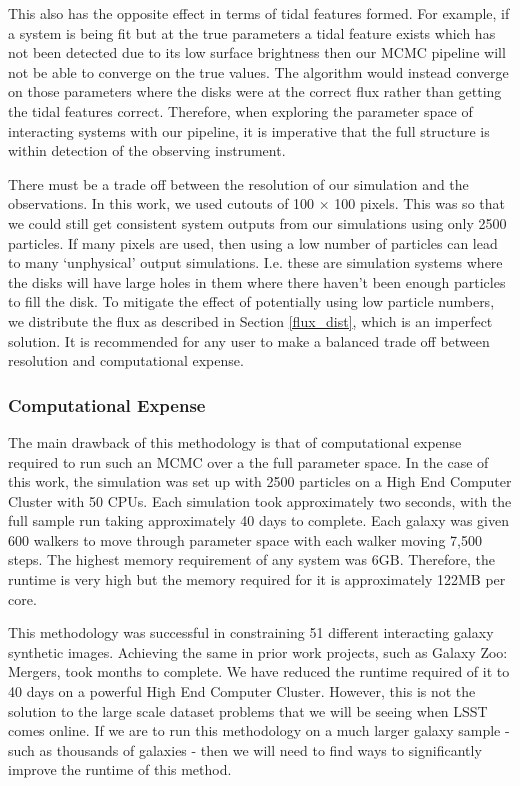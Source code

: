 This also has the opposite effect in terms of tidal features formed. For example, if a system is being fit but at the true parameters a tidal feature exists which has not been detected due to its low surface brightness then our MCMC pipeline will not be able to converge on the true values. The algorithm would instead converge on those parameters where the disks were at the correct flux rather than getting the tidal features correct. Therefore, when exploring the parameter space of interacting systems with our pipeline, it is imperative that the full structure is within detection of the observing instrument.

There must be a trade off between the resolution of our simulation and the observations. In this work, we used cutouts of 100 $\times$ 100 pixels. This was so that we could still get consistent system outputs from our simulations using only 2500 particles. If many pixels are used, then using a low number of particles can lead to many `unphysical' output simulations. I.e. these are simulation systems where the disks will have large holes in them where there haven't been enough particles to fill the disk. To mitigate the effect of potentially using low particle numbers, we distribute the flux as described in Section \ref{flux_dist}, which is an imperfect solution. It is recommended for any user to make a balanced trade off between resolution and computational expense.

\subsubsection{Computational Expense}\label{computational_expense}
\noindent The main drawback of this methodology is that of computational expense required to run such an MCMC over a the full parameter space. In the case of this work, the simulation was set up with 2500 particles on a High End Computer Cluster with 50 CPUs. Each simulation took approximately two seconds, with the full sample run taking approximately 40 days to complete. Each galaxy was given 600 walkers to move through parameter space with each walker moving 7,500 steps. The highest memory requirement of any system was 6GB. Therefore, the runtime is very high but the memory required for it is approximately 122MB per core.

This methodology was successful in constraining 51 different interacting galaxy synthetic images. Achieving the same in prior work projects, such as Galaxy Zoo: Mergers, took months to complete. We have reduced the runtime required of it to 40 days on a powerful High End Computer Cluster. However, this is not the solution to the large scale dataset problems that we will be seeing when LSST comes online. If we are to run this methodology on a much larger galaxy sample - such as thousands of galaxies - then we will need to find ways to significantly improve the runtime of this method.

